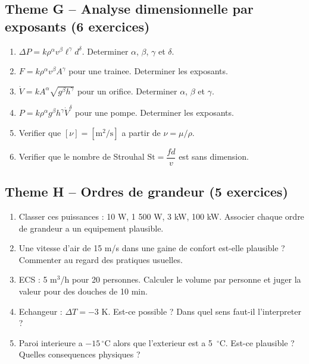 \subsection*{Theme G -- Analyse dimensionnelle par exposants (6 exercices)}
\begin{enumerate}[label=\textbf{G\arabic*}, leftmargin=1.8cm, itemsep=0.4em]
  \item $\Delta P = k \rho^\alpha v^\beta \ell^\gamma d^\delta$. Determiner $\alpha$, $\beta$, $\gamma$ et $\delta$.
  \item $F = k \rho^\alpha v^\beta A^\gamma$ pour une trainee. Determiner les exposants.
  \item $\dot{V} = k A^\alpha \sqrt{g^\beta h^\gamma}$ pour un orifice. Determiner $\alpha$, $\beta$ et $\gamma$.
  \item $P = k \rho^\alpha g^\beta h^\gamma \dot{V}^\delta$ pour une pompe. Determiner les exposants.
  \item Verifier que $[\nu] = [\mathrm{m^2/s}]$ a partir de $\nu = \mu / \rho$.
  \item Verifier que le nombre de Strouhal $\mathrm{St} = \dfrac{f d}{v}$ est sans dimension.
\end{enumerate}

\subsection*{Theme H -- Ordres de grandeur (5 exercices)}
\begin{enumerate}[label=\textbf{H\arabic*}, leftmargin=1.8cm, itemsep=0.4em]
  \item Classer ces puissances : 10 W, 1 500 W, 3 kW, 100 kW. Associer chaque ordre de grandeur a un equipement plausible.
  \item Une vitesse d'air de 15 m/s dans une gaine de confort est-elle plausible ? Commenter au regard des pratiques usuelles.
  \item ECS : 5 m$^3$/h pour 20 personnes. Calculer le volume par personne et juger la valeur pour des douches de 10 min.
  \item Echangeur : $\Delta T = -3$ K. Est-ce possible ? Dans quel sens faut-il l'interpreter ?
  \item Paroi interieure a $-15\,^\circ$C alors que l'exterieur est a 5~$^\circ$C. Est-ce plausible ? Quelles consequences physiques ?
\end{enumerate}

